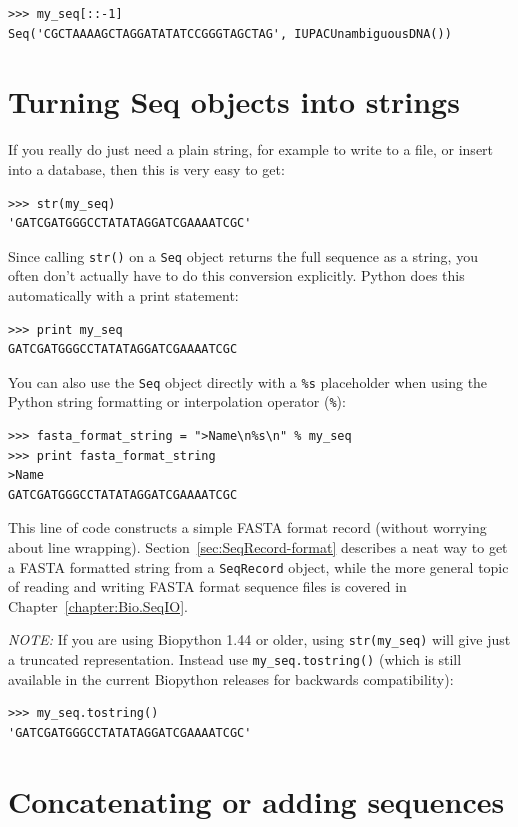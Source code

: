\documentclass{report}
\begin{document}
\begin{verbatim}
>>> my_seq[::-1]
Seq('CGCTAAAAGCTAGGATATATCCGGGTAGCTAG', IUPACUnambiguousDNA())
\end{verbatim}

\section{Turning Seq objects into strings}
\label{sec:seq-to-string}

If you really do just need a plain string, for example to write to a file, or insert into a database, then this is very easy to get:
\begin{verbatim}
>>> str(my_seq)
'GATCGATGGGCCTATATAGGATCGAAAATCGC'
\end{verbatim}

Since calling \verb|str()| on a \verb|Seq| object returns the full sequence as a string,
you often don't actually have to do this conversion explicitly.
Python does this automatically with a print statement:
\begin{verbatim}
>>> print my_seq
GATCGATGGGCCTATATAGGATCGAAAATCGC
\end{verbatim}

You can also use the \verb|Seq| object directly with a \verb|%s| placeholder when using the Python string formatting or interpolation operator (\verb|%|):
\begin{verbatim}
>>> fasta_format_string = ">Name\n%s\n" % my_seq
>>> print fasta_format_string
>Name
GATCGATGGGCCTATATAGGATCGAAAATCGC
\end{verbatim}

\noindent This line of code constructs a simple FASTA format record (without worrying about line wrapping).
Section~\ref{sec:SeqRecord-format} describes a neat way to get a FASTA formatted
string from a \verb|SeqRecord| object, while the more general topic of reading and
writing FASTA format sequence files is covered in Chapter~\ref{chapter:Bio.SeqIO}.

\emph{NOTE:} If you are using Biopython 1.44 or older, using \verb|str(my_seq)|
will give just a truncated representation.  Instead use \verb|my_seq.tostring()|
(which is still available in the current Biopython releases for backwards compatibility):

\begin{verbatim}
>>> my_seq.tostring()
'GATCGATGGGCCTATATAGGATCGAAAATCGC'
\end{verbatim}

\section{Concatenating or adding sequences}
\end{document}
